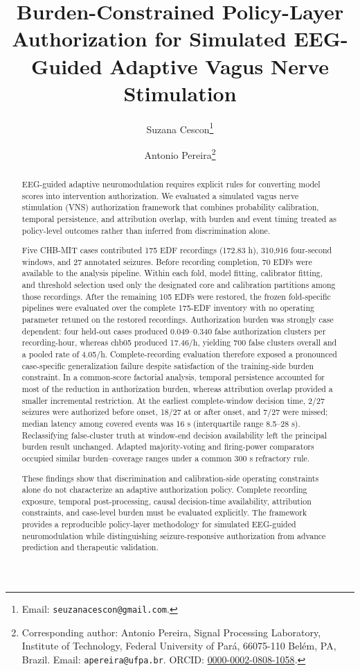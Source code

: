 \documentclass[11pt,a4paper]{article}
\title{Burden-Constrained Policy-Layer Authorization for Simulated EEG-Guided Adaptive Vagus Nerve Stimulation}
\author[1]{Suzana Cescon\thanks{Email: \texttt{seuzanacescon@gmail.com}.}}
\author[1]{Antonio Pereira\thanks{Corresponding author: Antonio Pereira, Signal Processing Laboratory, Institute of Technology, Federal University of Par\'a, 66075-110 Bel\'em, PA, Brazil. Email: \texttt{apereira@ufpa.br}. ORCID: \href{https://orcid.org/0000-0002-0808-1058}{0000-0002-0808-1058}.}}
\affil[1]{Signal Processing Laboratory, Institute of Technology, Federal University of Par\'a, 66075-110 Bel\'em, PA, Brazil}
\date{}
\begin{document}
\maketitle

\begin{abstract}
EEG-guided adaptive neuromodulation requires explicit rules for converting model scores into intervention authorization. We evaluated a simulated vagus nerve stimulation (VNS) authorization framework that combines probability calibration, temporal persistence, and attribution overlap, with burden and event timing treated as policy-level outcomes rather than inferred from discrimination alone.

Five CHB-MIT cases contributed 175 EDF recordings (172.83 h), 310,916 four-second windows, and 27 annotated seizures. Before recording completion, 70 EDFs were available to the analysis pipeline. Within each fold, model fitting, calibrator fitting, and threshold selection used only the designated core and calibration partitions among those recordings. After the remaining 105 EDFs were restored, the frozen fold-specific pipelines were evaluated over the complete 175-EDF inventory with no operating parameter retuned on the restored recordings. Authorization burden was strongly case dependent: four held-out cases produced 0.049--0.340 false authorization clusters per recording-hour, whereas chb05 produced 17.46/h, yielding 700 false clusters overall and a pooled rate of 4.05/h. Complete-recording evaluation therefore exposed a pronounced case-specific generalization failure despite satisfaction of the training-side burden constraint. In a common-score factorial analysis, temporal persistence accounted for most of the reduction in authorization burden, whereas attribution overlap provided a smaller incremental restriction. At the earliest complete-window decision time, 2/27 seizures were authorized before onset, 18/27 at or after onset, and 7/27 were missed; median latency among covered events was 16 s (interquartile range 8.5--28 s). Reclassifying false-cluster truth at window-end decision availability left the principal burden result unchanged. Adapted majority-voting and firing-power comparators occupied similar burden--coverage ranges under a common 300 s refractory rule.

These findings show that discrimination and calibration-side operating constraints alone do not characterize an adaptive authorization policy. Complete recording exposure, temporal post-processing, causal decision-time availability, attribution constraints, and case-level burden must be evaluated explicitly. The framework provides a reproducible policy-layer methodology for simulated EEG-guided neuromodulation while distinguishing seizure-responsive authorization from advance prediction and therapeutic validation.
\end{abstract}
\end{document}
